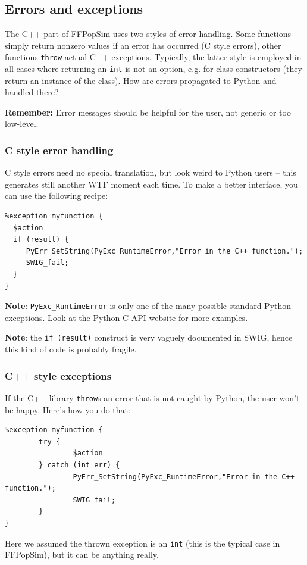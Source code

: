 \documentclass[12pt,a4paper,notitlepage,onecolumn]{article}
\begin{document}
\subsection{Errors and exceptions}
The C++ part of FFPopSim uses two styles of error handling. Some functions
simply return nonzero values if an error has occurred (C style errors), other
functions \texttt{throw} actual C++ exceptions. Typically, the latter style is
employed in all cases where returning an \texttt{int} is not an option, e.g. for
class constructors (they return an instance of the class). How are errors
propagated to Python and handled there?

\begin{framed}
\noindent \textbf{Remember:} Error messages should be helpful for the user, not
generic or too low-level.
\end{framed}

\subsubsection*{C style error handling}
C style errors need no special translation, but look weird to Python users -- this
generates still another WTF moment each time. To make a better interface, you
can use the following recipe:
\begin{verbatim}
%exception myfunction {
  $action
  if (result) {
     PyErr_SetString(PyExc_RuntimeError,"Error in the C++ function.");
     SWIG_fail;
  }
}
\end{verbatim}
\textbf{Note}: \texttt{PyExc\_RuntimeError} is only one of the many possible
standard Python exceptions. Look at the Python C API website for more examples.

\noindent\textbf{Note}: the \texttt{if (result)} construct is very vaguely documented in
SWIG, hence this kind of code is probably fragile.

\subsubsection*{C++ style exceptions}
If the C++ library \texttt{throw}s an error that is not caught by Python, the
user won't be happy. Here's how you do that:
\begin{verbatim}
%exception myfunction {
        try {
                $action
        } catch (int err) {
                PyErr_SetString(PyExc_RuntimeError,"Error in the C++ function.");
                SWIG_fail;
        }
}
\end{verbatim}
Here we assumed the thrown exception is an \texttt{int} (this is the typical
case in FFPopSim), but it can be anything really.



%
%
\end{document}
